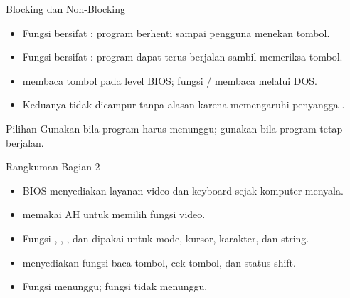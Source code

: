 \documentclass[aspectratio=169,11pt]{beamer}
\begin{document}
\begin{frame}{Blocking dan Non-Blocking}
\small
\begin{itemize}
    \item Fungsi  bersifat : program berhenti
          sampai pengguna menekan tombol.

    \vspace{0.18em}
    \item Fungsi  bersifat : program dapat
          terus berjalan sambil memeriksa tombol.

    \vspace{0.18em}
    \item {} membaca tombol pada level BIOS;
           fungsi / membaca melalui
          DOS.

    \vspace{0.18em}
    \item Keduanya tidak dicampur tanpa alasan karena memengaruhi
          penyangga .
\end{itemize}

\vspace{0.2em}
\begin{block}{Pilihan}
\small Gunakan  bila program harus menunggu; gunakan
 bila program tetap berjalan.
\end{block}
\end{frame}

\begin{frame}{Rangkuman Bagian 2}
\small
\begin{itemize}
    \item BIOS menyediakan layanan video dan keyboard sejak komputer
          menyala.

    \vspace{0.15em}
    \item {} memakai AH untuk memilih fungsi video.

    \vspace{0.15em}
    \item Fungsi , , , dan  dipakai
          untuk mode, kursor, karakter, dan string.

    \vspace{0.15em}
    \item {} menyediakan fungsi baca tombol, cek tombol,
          dan status shift.

    \vspace{0.15em}
    \item Fungsi  menunggu; fungsi  tidak menunggu.
\end{itemize}
\end{frame}
\end{document}
